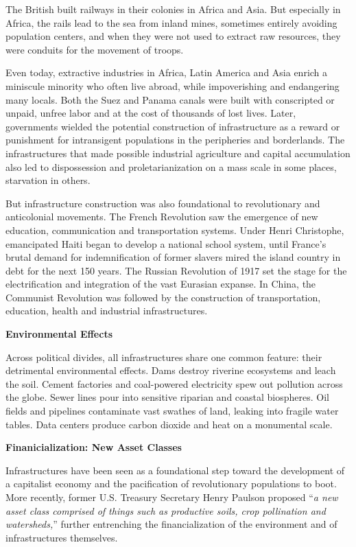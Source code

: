\documentclass[
]{book}
\begin{document}
The British built railways in their colonies in Africa and Asia. But especially in Africa, the rails lead to the sea from inland mines, sometimes entirely avoiding population centers, and when they were not used to extract raw resources, they were conduits for the movement of troops.

Even today, extractive industries in Africa, Latin America and Asia enrich a miniscule minority who often live abroad, while impoverishing and endangering many locals. Both the Suez and Panama canals were built with conscripted or unpaid, unfree labor and at the cost of thousands of lost lives. Later, governments wielded the potential construction of infrastructure as a reward or punishment for intransigent populations in the peripheries and borderlands. The infrastructures that made possible industrial agriculture and capital accumulation also led to dispossession and proletarianization on a mass scale in some places, starvation in others.

But infrastructure construction was also foundational to revolutionary and anticolonial movements. The French Revolution saw the emergence of new education, communication and transportation systems. Under Henri Christophe, emancipated Haiti began to develop a national school system, until France's brutal demand for indemnification of former slavers mired the island country in debt for the next 150 years. The Russian Revolution of 1917 set the stage for the electrification and integration of the vast Eurasian expanse.
In China, the Communist Revolution was followed by the construction of transportation, education, health and industrial infrastructures.

\textbf{Environmental Effects}

Across political divides, all infrastructures share one common feature: their detrimental environmental effects. Dams destroy riverine ecosystems and leach the soil. Cement factories and coal-powered electricity spew out pollution across the globe. Sewer lines pour into sensitive riparian and coastal biospheres. Oil fields and pipelines contaminate vast swathes of land, leaking into fragile water tables. Data centers produce carbon dioxide and heat on a monumental scale.

\textbf{Finanicialization: New Asset Classes}

Infrastructures have been seen as a foundational step toward the development of a capitalist economy and the pacification of revolutionary populations to boot. More recently, former U.S. Treasury Secretary Henry Paulson proposed ``\emph{a new asset class comprised of things such as productive soils, crop pollination and watersheds,}'' further entrenching the financialization of the environment and of infrastructures themselves.
\end{document}
